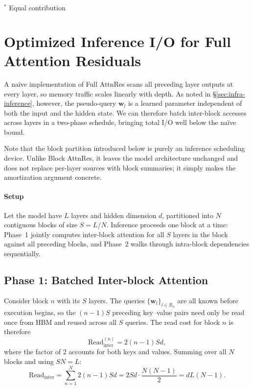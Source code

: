 $^*$ Equal contribution

\newpage

\section{Optimized Inference I/O for Full Attention Residuals}
\label{app:inference}

A na\"ive implementation of Full AttnRes scans all preceding layer outputs at every layer, so memory traffic scales linearly with depth. As noted in \S\ref{sec:infra-inference}, however, the pseudo-query $\bm{w}_l$ is a learned parameter independent of both the input and the hidden state. We can therefore batch inter-block accesses across layers in a two-phase schedule, bringing total I/O well below the na\"ive bound.

Note that the block partition introduced below is purely an inference scheduling device. Unlike Block AttnRes, it leaves the model architecture unchanged and does not replace per-layer sources with block summaries; it simply makes the amortization argument concrete.

\paragraph{Setup}

Let the model have $L$ layers and hidden dimension $d$, partitioned into $N$ contiguous blocks of size $S = L/N$. Inference proceeds one block at a time: Phase~1 jointly computes inter-block attention for all $S$ layers in the block against all preceding blocks, and Phase~2 walks through intra-block dependencies sequentially.

\subsection*{Phase 1: Batched Inter-block Attention}

Consider block $n$ with its $S$ layers. The queries $\{\bm{w}_l\}_{l \in \mathcal{B}_n}$ are all known before execution begins, so the $(n{-}1)S$ preceding key--value pairs need only be read once from HBM and reused across all $S$ queries. The read cost for block $n$ is therefore
\begin{equation}
    \mathrm{Read}_{\text{inter}}^{(n)} = 2(n-1)Sd,
\end{equation}
where the factor of $2$ accounts for both keys and values. Summing over all $N$ blocks and using $SN=L$:
\begin{equation}
    \mathrm{Read}_{\text{inter}} = \sum_{n=1}^{N} 2(n-1)Sd
    = 2Sd \cdot \frac{N(N-1)}{2}
    = dL(N-1).
\end{equation}


